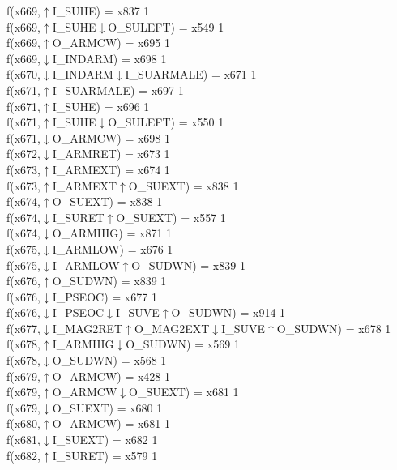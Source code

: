 f(x669,$\uparrow$I\_SUHE) = x837 {1} \\
f(x669,$\uparrow$I\_SUHE$\downarrow$O\_SULEFT) = x549 {1} \\
f(x669,$\uparrow$O\_ARMCW) = x695 {1} \\
f(x669,$\downarrow$I\_INDARM) = x698 {1} \\
f(x670,$\downarrow$I\_INDARM$\downarrow$I\_SUARMALE) = x671 {1} \\
f(x671,$\uparrow$I\_SUARMALE) = x697 {1} \\
f(x671,$\uparrow$I\_SUHE) = x696 {1} \\
f(x671,$\uparrow$I\_SUHE$\downarrow$O\_SULEFT) = x550 {1} \\
f(x671,$\downarrow$O\_ARMCW) = x698 {1} \\
f(x672,$\downarrow$I\_ARMRET) = x673 {1} \\
f(x673,$\uparrow$I\_ARMEXT) = x674 {1} \\
f(x673,$\uparrow$I\_ARMEXT$\uparrow$O\_SUEXT) = x838 {1} \\
f(x674,$\uparrow$O\_SUEXT) = x838 {1} \\
f(x674,$\downarrow$I\_SURET$\uparrow$O\_SUEXT) = x557 {1} \\
f(x674,$\downarrow$O\_ARMHIG) = x871 {1} \\
f(x675,$\downarrow$I\_ARMLOW) = x676 {1} \\
f(x675,$\downarrow$I\_ARMLOW$\uparrow$O\_SUDWN) = x839 {1} \\
f(x676,$\uparrow$O\_SUDWN) = x839 {1} \\
f(x676,$\downarrow$I\_PSEOC) = x677 {1} \\
f(x676,$\downarrow$I\_PSEOC$\downarrow$I\_SUVE$\uparrow$O\_SUDWN) = x914 {1} \\
f(x677,$\downarrow$I\_MAG2RET$\uparrow$O\_MAG2EXT$\downarrow$I\_SUVE$\uparrow$O\_SUDWN) = x678 {1} \\
f(x678,$\uparrow$I\_ARMHIG$\downarrow$O\_SUDWN) = x569 {1} \\
f(x678,$\downarrow$O\_SUDWN) = x568 {1} \\
f(x679,$\uparrow$O\_ARMCW) = x428 {1} \\
f(x679,$\uparrow$O\_ARMCW$\downarrow$O\_SUEXT) = x681 {1} \\
f(x679,$\downarrow$O\_SUEXT) = x680 {1} \\
f(x680,$\uparrow$O\_ARMCW) = x681 {1} \\
f(x681,$\downarrow$I\_SUEXT) = x682 {1} \\
f(x682,$\uparrow$I\_SURET) = x579 {1} \\
